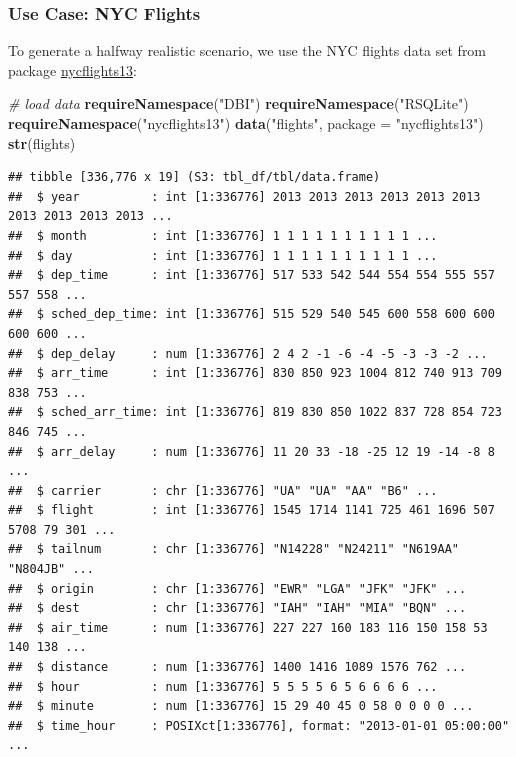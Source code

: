 \documentclass[]{article}
\newenvironment{Shaded}{\begin{snugshade}}{\end{snugshade}}
\newcommand{\CommentTok}[1]{\textcolor[rgb]{0.56,0.35,0.01}{\textit{#1}}}
\newcommand{\DataTypeTok}[1]{\textcolor[rgb]{0.13,0.29,0.53}{#1}}
\newcommand{\KeywordTok}[1]{\textcolor[rgb]{0.13,0.29,0.53}{\textbf{#1}}}
\newcommand{\NormalTok}[1]{#1}
\newcommand{\StringTok}[1]{\textcolor[rgb]{0.31,0.60,0.02}{#1}}
\renewenvironment{Shaded} {\begin{snugshade}\small} {\end{snugshade}}
\begin{document}
\hypertarget{use-case-nyc-flights}{%
\subsubsection{Use Case: NYC Flights}\label{use-case-nyc-flights}}

To generate a halfway realistic scenario, we use the NYC flights data set from package \href{https://cran.r-project.org/package=nycflights13}{nycflights13}:

\begin{Shaded}
\begin{Highlighting}[]
\CommentTok{# load data}
\KeywordTok{requireNamespace}\NormalTok{(}\StringTok{"DBI"}\NormalTok{)}
\KeywordTok{requireNamespace}\NormalTok{(}\StringTok{"RSQLite"}\NormalTok{)}
\KeywordTok{requireNamespace}\NormalTok{(}\StringTok{"nycflights13"}\NormalTok{)}
\KeywordTok{data}\NormalTok{(}\StringTok{"flights"}\NormalTok{, }\DataTypeTok{package =} \StringTok{"nycflights13"}\NormalTok{)}
\KeywordTok{str}\NormalTok{(flights)}
\end{Highlighting}
\end{Shaded}

\begin{verbatim}
## tibble [336,776 x 19] (S3: tbl_df/tbl/data.frame)
##  $ year          : int [1:336776] 2013 2013 2013 2013 2013 2013 2013 2013 2013 2013 ...
##  $ month         : int [1:336776] 1 1 1 1 1 1 1 1 1 1 ...
##  $ day           : int [1:336776] 1 1 1 1 1 1 1 1 1 1 ...
##  $ dep_time      : int [1:336776] 517 533 542 544 554 554 555 557 557 558 ...
##  $ sched_dep_time: int [1:336776] 515 529 540 545 600 558 600 600 600 600 ...
##  $ dep_delay     : num [1:336776] 2 4 2 -1 -6 -4 -5 -3 -3 -2 ...
##  $ arr_time      : int [1:336776] 830 850 923 1004 812 740 913 709 838 753 ...
##  $ sched_arr_time: int [1:336776] 819 830 850 1022 837 728 854 723 846 745 ...
##  $ arr_delay     : num [1:336776] 11 20 33 -18 -25 12 19 -14 -8 8 ...
##  $ carrier       : chr [1:336776] "UA" "UA" "AA" "B6" ...
##  $ flight        : int [1:336776] 1545 1714 1141 725 461 1696 507 5708 79 301 ...
##  $ tailnum       : chr [1:336776] "N14228" "N24211" "N619AA" "N804JB" ...
##  $ origin        : chr [1:336776] "EWR" "LGA" "JFK" "JFK" ...
##  $ dest          : chr [1:336776] "IAH" "IAH" "MIA" "BQN" ...
##  $ air_time      : num [1:336776] 227 227 160 183 116 150 158 53 140 138 ...
##  $ distance      : num [1:336776] 1400 1416 1089 1576 762 ...
##  $ hour          : num [1:336776] 5 5 5 5 6 5 6 6 6 6 ...
##  $ minute        : num [1:336776] 15 29 40 45 0 58 0 0 0 0 ...
##  $ time_hour     : POSIXct[1:336776], format: "2013-01-01 05:00:00" ...
\end{verbatim}
\end{document}
